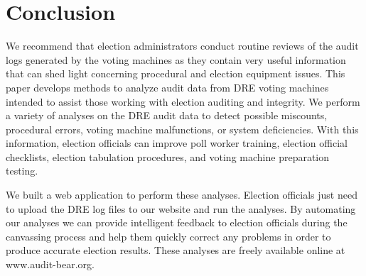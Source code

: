 \section{Conclusion}
We recommend that election administrators conduct routine reviews of the audit logs generated by the voting machines as they contain very useful information that can shed light concerning procedural and election equipment issues. This paper develops methods to analyze audit data from DRE voting machines intended to assist those working with election auditing and integrity.   We perform a variety of analyses on the DRE audit data to detect possible miscounts, procedural errors, voting machine malfunctions, or system deficiencies. With this information, election officials can improve poll worker training, election official checklists, election tabulation procedures, and voting machine preparation testing.

We built a web application to perform these analyses. Election officials just need to upload the DRE log files to our website and run the analyses. By automating our analyses we can provide intelligent feedback to election officials during the canvassing process and help them quickly correct any problems in order to produce accurate election results. These analyses are freely available online at www.audit-bear.org.
